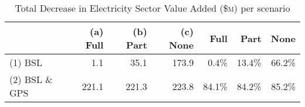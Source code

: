 \begin{table}[H]
\centering
\caption{Total Decrease in Electricity Sector Value Added (\$\textsc{m}) per scenario} 
\begin{tabular}{lrrr|rrr}
  \hline
 &  (a) Full & (b) Part & (c) None & Full & Part & None \\ 
  \hline
(1) BSL & 1.1 & 35.1 & 173.9 & 0.4\% & 13.4\% & 66.2\% \\ 
  (2) BSL \& GPS & 221.1 & 221.3 & 223.8 & 84.1\% & 84.2\% & 85.2\% \\ 
   \hline
\end{tabular}
\end{table}
